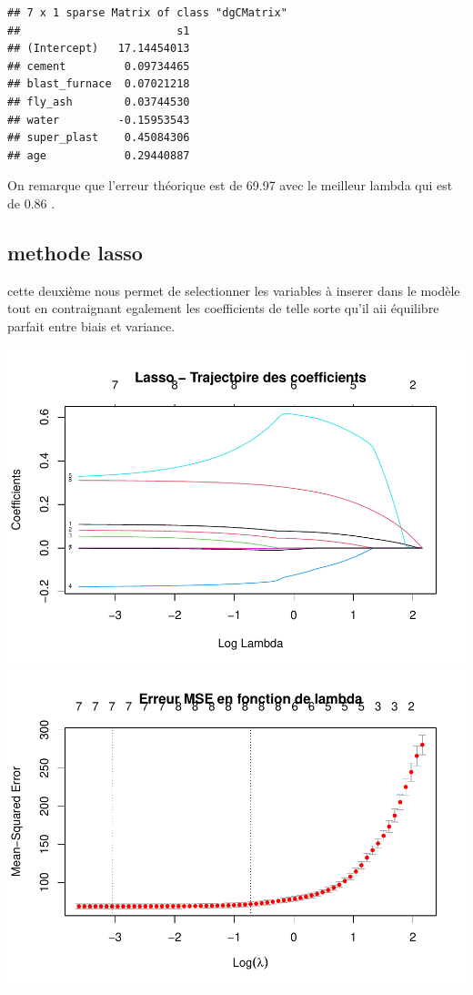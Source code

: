 \documentclass[
  12pt,
]{article}
\begin{document}
\begin{verbatim}
## 7 x 1 sparse Matrix of class "dgCMatrix"
##                        s1
## (Intercept)   17.14454013
## cement         0.09734465
## blast_furnace  0.07021218
## fly_ash        0.03744530
## water         -0.15953543
## super_plast    0.45084306
## age            0.29440887
\end{verbatim}

On remarque que l'erreur théorique est de 69.97 avec le meilleur lambda
qui est de 0.86 .

\subsection{methode lasso}\label{methode-lasso}

cette deuxième nous permet de selectionner les variables à inserer dans
le modèle tout en contraignant egalement les coefficients de telle sorte
qu'il aii équilibre parfait entre biais et variance.

\includegraphics{rmd_final_files/figure-latex/unnamed-chunk-63-1.pdf}
\includegraphics{rmd_final_files/figure-latex/unnamed-chunk-63-2.pdf}
\end{document}
